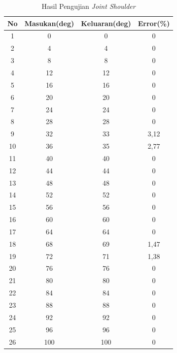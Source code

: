 \begin{table}[!htbp]
	\small
	\centering
	\caption{Hasil Pengujian \textit{Joint Shoulder}}
	\label{tbl.jointshoulder}
	\begin{tabular}{|c|c|c|c|}
		\hline
		\rowcolor[HTML]{9B9B9B} 
		No & Masukan(deg) & Keluaran(deg) & Error(\%)      \\ \hline
		1  & 0       & 0        & 0           \\ \hline
		2  & 4       & 4        & 0           \\ \hline
		3  & 8       & 8        & 0           \\ \hline
		4  & 12      & 12       & 0           \\ \hline
		5  & 16      & 16       & 0           \\ \hline
		6  & 20      & 20       & 0           \\ \hline
		7  & 24      & 24       & 0           \\ \hline
		8  & 28      & 28       & 0           \\ \hline
		9  & 32      & 33       & 3,12      \\ \hline
		10 & 36      & 35       & 2,77 \\ \hline
		11 & 40      & 40       & 0           \\ \hline
		12 & 44      & 44       & 0           \\ \hline
		13 & 48      & 48       & 0           \\ \hline
		14 & 52      & 52       & 0           \\ \hline
		15 & 56      & 56       & 0           \\ \hline
		16 & 60      & 60       & 0           \\ \hline
		17 & 64      & 64       & 0           \\ \hline
		18 & 68      & 69       & 1,47 \\ \hline
		19 & 72      & 71       & 1,38 \\ \hline
		20 & 76      & 76       & 0           \\ \hline
		21 & 80      & 80       & 0           \\ \hline
		22 & 84      & 84       & 0           \\ \hline
		23 & 88      & 88       & 0           \\ \hline
		24 & 92      & 92       & 0           \\ \hline
		25 & 96      & 96       & 0           \\ \hline
		26 & 100     & 100      & 0           \\ \hline

\end{tabular}
\end{table}
